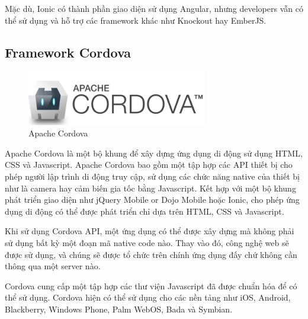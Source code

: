 Mặc dù, Ionic có thành phần giao diện sử dụng Angular, nhưng developers vẫn có thể sử dụng và hỗ trợ các framework khác như Knockout hay EmberJS.



\subsection{Framework Cordova}

\begin{figure}[H]
\centering    
\includegraphics[width=0.7\textwidth]{cordova}
\caption[Apache Cordova ]{Apache Cordova}
\label{fig:cordova}
\end{figure}

Apache Cordova là một bộ khung để xây dựng ứng dụng di động sử dụng HTML, CSS và Javascript. Apache Cordova bao gồm một tập hợp các API thiết bị cho phép người lập trình di động truy cập, sử dụng các chức năng native của thiết bị như là camera hay cảm biến gia tốc bằng Javascript. Kết hợp với một bộ khung phát triển giao diện như jQuery Mobile or Dojo Mobile hoặc Ionic, cho phép ứng dụng di động có thể được phát triển chỉ dựa trên HTML, CSS và Javascript.

Khi sử dụng Cordova API, một ứng dụng có thể được xây dựng mà không phải sử dụng bất kỳ một đoạn mã native code nào. Thay vào đó, công nghệ web sẽ được sử dụng, và chúng sẽ được tổ chức trên chính ứng dụng đấy chứ không cần thông qua một server nào.

Cordova cung cấp một tập hợp các thư viện Javascript đã được chuẩn hóa để có thể sử dụng. Cordova hiện có thể sử dụng cho các nền tảng như iOS, Android, Blackberry, Windows Phone, Palm WebOS, Bada và Symbian.

